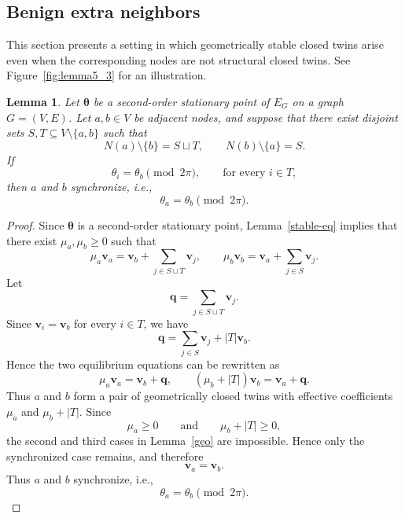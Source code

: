 \documentclass[11pt,reqno]{amsart}
\newtheorem{lemma}[theorem]{Lemma}
\theoremstyle{definition}
\begin{document}
\subsection{Benign extra neighbors}\label{sec:benign-extra}
This section presents a setting in which geometrically stable closed twins arise even when the corresponding nodes are not structural closed twins. See Figure~\ref{fig:lemma5_3}
for an illustration.

\begin{lemma}\label{pairwise-no-nauty-extra-node}
Let $\boldsymbol{\theta}$ be a second-order stationary point of $E_G$ on a graph
$G=(V,E)$.
Let $a,b\in V$ be adjacent nodes, and suppose that there exist disjoint sets
$S,T\subseteq V\setminus\{a,b\}$ such that
\[
N(a)\setminus\{b\}=S\sqcup T,
\qquad
N(b)\setminus\{a\}=S.
\]
If
\[
\theta_i=\theta_b \pmod{2\pi}, \qquad\text{for every } i\in T,
\]
then $a$ and $b$ synchronize, i.e.,
\[
\theta_a=\theta_b \pmod{2\pi}.
\]
\end{lemma}

\begin{proof}
Since $\boldsymbol{\theta}$ is a second-order stationary point,
Lemma~\ref{stable-eq} implies that there exist $\mu_a,\mu_b\ge 0$ such that
\[
\mu_a\mathbf{v}_a
=
\mathbf{v}_b+\sum_{j\in S\sqcup T}\mathbf{v}_j,
\qquad
\mu_b\mathbf{v}_b
=
\mathbf{v}_a+\sum_{j\in S}\mathbf{v}_j.
\]
Let
\[
\mathbf q=\sum_{j\in S\sqcup T}\mathbf{v}_j.
\]
Since $\mathbf{v}_i=\mathbf{v}_b$ for every $i\in T$, we have
\[
\mathbf q
=
\sum_{j\in S}\mathbf{v}_j+|T|\mathbf{v}_b.
\]
Hence the two equilibrium equations can be rewritten as
\[
\mu_a\mathbf{v}_a
=
\mathbf{v}_b+\mathbf q,
\qquad
(\mu_b+|T|)\mathbf{v}_b
=
\mathbf{v}_a+\mathbf q.
\]
Thus $a$ and $b$ form a pair of geometrically closed twins with effective coefficients
$\mu_a$ and $\mu_b+|T|$. Since
\[
\mu_a\ge0
\qquad\text{and}\qquad
\mu_b+|T|\ge0,
\]
the second and third cases in Lemma~\ref{geo} are impossible. Hence only the
synchronized case remains, and therefore
\[
\mathbf{v}_a=\mathbf{v}_b.
\]
Thus $a$ and $b$ synchronize, i.e., \[
\theta_a=\theta_b \pmod{2\pi}.
\]
\end{proof}
\end{document}
